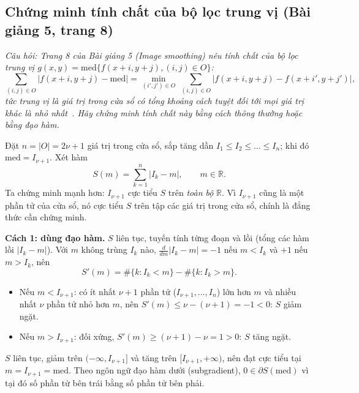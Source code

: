 \subsection{Chứng minh tính chất của bộ lọc trung vị (Bài giảng 5, trang 8)}
\label{subsec:w6_median_proof}

\textit{Câu hỏi: Trang 8 của Bài giảng 5 (\emph{Image smoothing}) nêu tính chất của bộ lọc trung vị $g(x, y) = \mathrm{med}\{f(x + i, y + j), (i, j) \in O\}$:
\[
\sum_{(i, j) \in O}\big|f(x + i, y + j) - \mathrm{med}\big| = \min_{(i', j') \in O}\ \sum_{(i, j) \in O}\big|f(x + i, y + j) - f(x + i', y + j')\big|,
\]
tức trung vị là giá trị trong cửa sổ có tổng khoảng cách tuyệt đối tới mọi giá trị khác là nhỏ nhất~\citep{xlav_lec5}. Hãy chứng minh tính chất này bằng cách thông thường hoặc bằng đạo hàm.}


Đặt $n = |O| = 2\nu + 1$ giá trị trong cửa sổ, sắp tăng dần $I_1 \le I_2 \le \ldots \le I_n$; khi đó $\mathrm{med} = I_{\nu + 1}$. Xét hàm
\begin{equation}
S(m) = \sum_{k=1}^{n} |I_k - m|, \qquad m \in \mathbb{R}.
\end{equation}
Ta chứng minh mạnh hơn: $I_{\nu + 1}$ cực tiểu $S$ trên \emph{toàn bộ} $\mathbb{R}$. Vì $I_{\nu + 1}$ cũng là một phần tử của cửa sổ, nó cực tiểu $S$ trên tập các giá trị trong cửa sổ, chính là đẳng thức cần chứng minh.

\textbf{Cách 1: dùng đạo hàm.} $S$ liên tục, tuyến tính từng đoạn và lồi (tổng các hàm lồi $|I_k - m|$). Với $m$ không trùng $I_k$ nào, $\frac{d}{dm}|I_k - m| = -1$ nếu $m < I_k$ và $+1$ nếu $m > I_k$, nên
\begin{equation}
S'(m) = \#\{k : I_k < m\} - \#\{k : I_k > m\}.
\end{equation}
\begin{itemize}
    \item Nếu $m < I_{\nu + 1}$: có ít nhất $\nu + 1$ phần tử ($I_{\nu + 1}, \ldots, I_n$) lớn hơn $m$ và nhiều nhất $\nu$ phần tử nhỏ hơn $m$, nên $S'(m) \le \nu - (\nu + 1) = -1 < 0$: $S$ giảm ngặt.
    \item Nếu $m > I_{\nu + 1}$: đối xứng, $S'(m) \ge (\nu + 1) - \nu = 1 > 0$: $S$ tăng ngặt.
\end{itemize}
$S$ liên tục, giảm trên $(-\infty, I_{\nu + 1}]$ và tăng trên $[I_{\nu + 1}, +\infty)$, nên đạt cực tiểu tại $m = I_{\nu + 1} = \mathrm{med}$. Theo ngôn ngữ đạo hàm dưới (subgradient), $0 \in \partial S(\mathrm{med})$ vì tại đó số phần tử bên trái bằng số phần tử bên phải.

